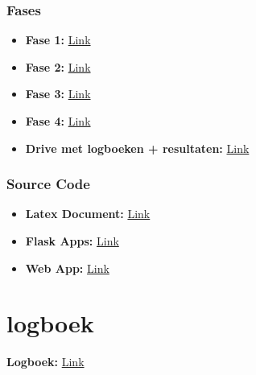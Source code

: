 \documentclass[12pt]{article}
\begin{document}
\subsubsection*{Fases}
\noindent\begin{itemize}
    \item \textbf{Fase 1: }\href{https://docs.google.com/document/d/1GbDkCxC9d_qvIaFt9WLgdqDdbehZgxvDl6xok6A8UG4}{Link} 
    \item \textbf{Fase 2: }\href{https://docs.google.com/document/d/1dRJIgrINIqM23WWmCmnGbnBuHpgw_vz0cuFKtMpCIMs}{Link} 
    \item \textbf{Fase 3: }\href{https://docs.google.com/document/d/1c8uWC6ebqpnVRqx3ldwISSlsHXozZ7VrJujyB8FCNq4}{Link} 
    \item \textbf{Fase 4: }\href{https://docs.google.com/document/d/1G-Xw7bRIdZ-OzQIb8x2kHXSOT6rMff9jRx3bLR63h5I}{Link} 
    \item \textbf{Drive met logboeken + resultaten: }\href{https://drive.google.com/drive/folders/13nWxB8IXRV8BVmQFYKsMhVHrp6tId7Cc?usp=drive_link}{Link} 
\end{itemize}

\subsubsection*{Source Code}
\noindent\begin{itemize}
    \item \textbf{Latex Document: }\href{https://github.com/TanteJossa/PWS-latex/blob/main/full.tex}{Link} 
    \item \textbf{Flask Apps: }\href{https://github.com/TanteJossa/PWS-inscannen}{Link} 
    \item \textbf{Web App: }\href{https://github.com/TanteJossa/PWS-teacher-web-app}{Link} 
\end{itemize}


\pagebreak
\section{logboek}
\noindent\textbf{Logboek: }\href{https://docs.google.com/spreadsheets/d/1iMSadKjVQ10j7RvIdU1Dxt36Q_K4ckz7q1kMr5_YCWw/edit?usp=sharing}{Link} 
\end{document}
